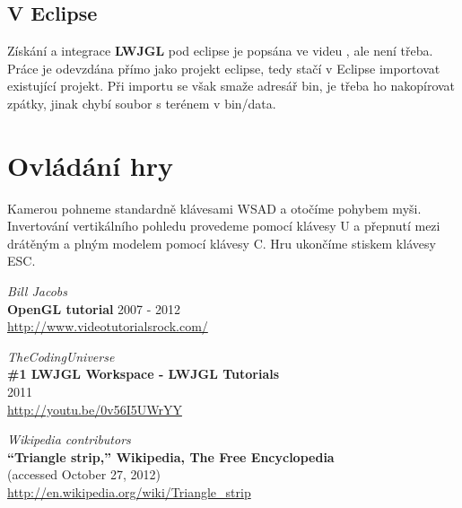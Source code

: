 \documentclass[11pt]{article}
\begin{document}
\subsection{V Eclipse}
Získání a integrace \textbf {LWJGL} pod eclipse je popsána ve videu
\cite{installtut}, ale není třeba. Práce je odevzdána přímo jako projekt
eclipse, tedy stačí v Eclipse importovat existující projekt. Při importu se
však smaže adresář bin, je třeba ho nakopírovat zpátky, jinak chybí soubor s
terénem v bin/data.


\section{Ovládání hry}
Kamerou pohneme standardně klávesami WSAD a otočíme pohybem myši. Invertování
vertikálního pohledu provedeme pomocí klávesy U a přepnutí mezi drátěným a
plným modelem pomocí klávesy C. Hru ukončíme stiskem klávesy ESC.


\begin{thebibliography}{3}
{\em Bill Jacobs} \\
{\bf OpenGL tutorial}
	2007 - 2012 \\
\url{http://www.videotutorialsrock.com/}

{\em TheCodingUniverse} \\
{\bf \#1 LWJGL Workspace - LWJGL Tutorials} \\
	2011 \\
\url{http://youtu.be/0v56I5UWrYY}

{\em Wikipedia contributors} \\
{\bf ``Triangle strip,'' Wikipedia, The Free Encyclopedia} \\
	(accessed October 27, 2012) \\
\url{http://en.wikipedia.org/wiki/Triangle_strip}


\end{thebibliography}
\end{document}
